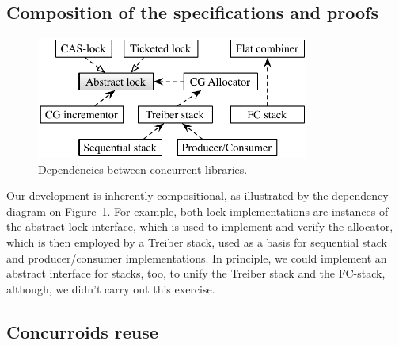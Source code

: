 \subsection{Composition of the specifications and proofs}
\label{sec:comp-spec-proofs}

%
{
\setlength{\belowcaptionskip}{-15pt}  
\begin{figure}[t]
\centering
\includegraphics[width=0.8\textwidth]{dependencies.pdf}
\caption{Dependencies between concurrent libraries.}
\label{fig:deps}
\end{figure}
}
%
Our development is inherently compositional, as illustrated by the
dependency diagram on Figure~\ref{fig:deps}. For example, both lock
implementations are instances of the abstract lock interface,
%
%
which is used to implement and verify the allocator, which is then
employed by a Treiber stack, used as a basis for sequential stack
and producer/consumer implementations. In principle, we could
implement an abstract interface for stacks, too, to unify the Treiber
stack and the FC-stack, although, we didn't carry out this exercise.

\subsection{Concurroids reuse}
\label{sec:concurroids-reuse}

